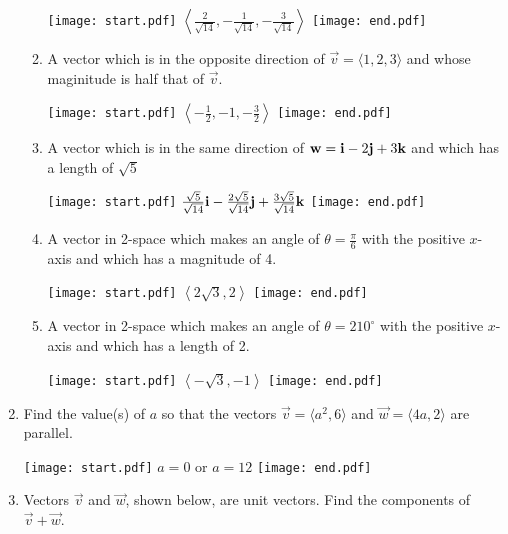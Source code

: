 \documentclass[12pt]{article}
\begin{document}
\begin{enumerate}
\begin{enumerate}
\texttt{[image: start.pdf]}
{{$\left \langle \frac{2}{\sqrt{14}},-\frac{1}{\sqrt{14}},-\frac{3}{\sqrt{14}} \right \rangle$}}
\texttt{[image: end.pdf]}


\item A vector which is in the opposite direction of $\overrightarrow{v}=\langle1,2,3\rangle$ and whose maginitude is half that of $\overrightarrow{v}$.

\texttt{[image: start.pdf]}
{{$\left \langle -\frac{1}{2},-1,-\frac{3}{2}\right\rangle$}}
\texttt{[image: end.pdf]}


\item A vector which is in the same direction of ${\bf w}={\bf i}-2{\bf j}+3{\bf k}$ and which has a length of $\sqrt{5}$

\texttt{[image: start.pdf]}
{{$\frac{\sqrt{5}}{\sqrt{14}}{\bf i}-\frac{2\sqrt{5}}{\sqrt{14}}{\bf j}+\frac{3\sqrt{5}}{\sqrt{14}}{\bf k}$}}
\texttt{[image: end.pdf]}


\item A vector in 2-space which makes an angle of $\theta=\frac{\pi}{6}$ with the positive $x$-axis and which has a magnitude of 4.

\texttt{[image: start.pdf]}
{{$\left \langle 2\sqrt{3}, 2 \right \rangle$}}
\texttt{[image: end.pdf]}


\item A vector in 2-space which makes an angle of $\theta=210^{\circ}$ with the positive $x$-axis and which has a length of 2.

\texttt{[image: start.pdf]}
{{$\left \langle -\sqrt{3},-1 \right \rangle$}}
\texttt{[image: end.pdf]}


\end{enumerate}

\item Find the value(s) of $a$ so that the vectors $\overrightarrow{v}=\langle a^2,6 \rangle$ and $\overrightarrow{w}=\langle 4a, 2 \rangle$ are parallel.

\texttt{[image: start.pdf]}
{{$a=0$ or $a=12$}}
\texttt{[image: end.pdf]}


\item Vectors $\overrightarrow{v}$ and $\overrightarrow{w}$, shown below, are unit vectors.  Find the components of $\overrightarrow{v}+\overrightarrow{w}$.


\end{enumerate}
\end{document}
